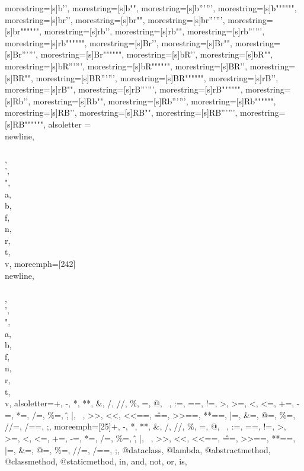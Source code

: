 {  %
  morestring=[s]{b'}{'}, morestring=[s]{b"}{"},
  morestring=[s]{b'''}{'''}, morestring=[s]{b"""}{"""},
  morestring=[s]{br'}{'}, morestring=[s]{br"}{"},
  morestring=[s]{br'''}{'''}, morestring=[s]{br"""}{"""},
  morestring=[s]{rb'}{'}, morestring=[s]{rb"}{"},
  morestring=[s]{rb'''}{'''}, morestring=[s]{rb"""}{"""},
  morestring=[s]{Br'}{'}, morestring=[s]{Br"}{"},
  morestring=[s]{Br'''}{'''}, morestring=[s]{Br"""}{"""},
  morestring=[s]{bR'}{'}, morestring=[s]{bR"}{"},
  morestring=[s]{bR'''}{'''}, morestring=[s]{bR"""}{"""},
  morestring=[s]{BR'}{'}, morestring=[s]{BR"}{"},
  morestring=[s]{BR'''}{'''}, morestring=[s]{BR"""}{"""},
  morestring=[s]{rB'}{'}, morestring=[s]{rB"}{"},
  morestring=[s]{rB'''}{'''}, morestring=[s]{rB"""}{"""},
  morestring=[s]{Rb'}{'}, morestring=[s]{Rb"}{"},
  morestring=[s]{Rb'''}{'''}, morestring=[s]{Rb"""}{"""},
  morestring=[s]{RB'}{'}, morestring=[s]{RB"}{"},
  morestring=[s]{RB'''}{'''}, morestring=[s]{RB"""}{"""},
  alsoletter = {\\newline,\\\\,\\',\\",\\a,\\b,\\f,\\n,\\r,\\t,\\v},
  moreemph=[242]{\\newline,\\\\,\\',\\",\\a,\\b,\\f,\\n,\\r,\\t,\\v},
  alsoletter={+, -, *, **, \&, /, //, \%, =, @, ~, :=, ==, !=, >, >=, <, <=,
  +=, -=, *=, /=, \%=, \^, |, ~, >>, <<, <<==, \^==, >>==, **==, |=, \&=, @=,
  \%=, //=, /==, ;},
  moreemph=[25]{+, -, *, **, \&, /, //, \%, =, @, ~, :=, ==, !=, >, >=, <, <=,
  +=, -=, *=, /=, \%=, \^, |, ~, >>, <<, <<==, \^==, >>==, **==, |=, \&=, @=,
  \%=, //=, /==, ;, @dataclass, @lambda, @abstractmethod, @classmethod,
  @staticmethod, in, and, not, or, is},
}
